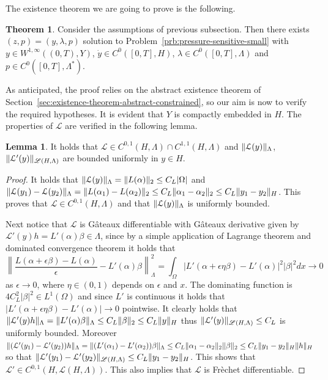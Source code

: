 \documentclass[a4paper,10pt,oneside]{amsbook}
\numberwithin{section}{chapter}
\numberwithin{equation}{chapter}
\theoremstyle{definition}
\newtheorem{thm}[prop]{Theorem}
\newtheorem{lemma}[prop]{Lemma}
\DeclarePairedDelimiter{\norm}{\lVert}{\rVert}
\begin{document}
The existence theorem we are going to prove is the following.
\begin{thm}
\label{thm:existence-pressure-small}
Consider the assumptions of previous subsection. Then there exists $(z,p)=(y,\lambda,p)$ solution to Problem~\ref{prb:pressure-sensitive-small} with $y\in W^{1,\infty}((0,T),Y)$, $\dot y\in C^0([0,T],H)$, $\lambda\in C^0([0,T],\Lambda)$ and $p\in C^0([0,T],\Lambda^*)$.
\end{thm}
As anticipated, the proof relies on the abstract existence theorem of Section~\ref{sec:existence-theorem-abstract-constrained}, so our aim is now to verify the required hypotheses. It is evident that $Y$ is compactly embedded in $H$. The properties of $\mathcal{L}$ are verified in the following lemma.
\begin{lemma}
It holds that $\mathcal{L}\in C^{0,1}(H,\Lambda)\cap C^{1,1}(H,\Lambda)$ and $\norm{\mathcal{L}(y)}_\Lambda$, $\norm{\mathcal{L}'(y)}_{\mathscr{L}(H,\Lambda)}$ are bounded uniformly in $y\in H$.
\end{lemma}
\begin{proof}
It holds that $\norm{\mathcal{L}(y)}_\Lambda=\norm{L(\alpha)}_2\le C_L|\Omega|$ and $\norm{\mathcal{L}(y_1)-\mathcal{L}(y_2)}_\Lambda=\norm{L(\alpha_1)-L(\alpha_2)}_2\le C_L\norm{\alpha_1-\alpha_2}_2\le C_L\norm{y_1-y_2}_H$. This proves that $\mathcal{L}\in C^{0,1}(H,\Lambda)$ and that $\norm{\mathcal{L}(y)}_\Lambda$ is uniformly bounded.

Next notice that $\mathcal{L}$ is G\^ateaux differentiable with G\^ateaux derivative given by $\mathcal{L}'(y)h=L'(\alpha)\beta\in\Lambda$, since by a simple application of Lagrange theorem and dominated convergence theorem it holds that
\[
\left\|\frac{{L}(\alpha+\epsilon\beta)-{L}(\alpha)}{\epsilon}-L'(\alpha)\beta\right\|_\Lambda^2=\int_\Omega|L'(\alpha+\epsilon\eta\beta)-L'(\alpha)|^2|\beta|^2dx\to0
\]
as $\epsilon\to0$, where $\eta\in(0,1)$ depends on $\epsilon$ and $x$. The dominating function is $4C_L^2|\beta|^2\in L^1(\Omega)$ and since $L'$ is continuous it holds that $|L'(\alpha+\epsilon\eta\beta)-L'(\alpha)|\to0$ pointwise. It clearly holds that $\norm{\mathcal{L}'(y)h}_\Lambda=\norm{L'(\alpha)\beta}_\Lambda\le C_L\norm{\beta}_2\le C_L\norm{y}_H$ thus $\norm{\mathcal{L}'(y)}_{\mathscr{L}(H,\Lambda)}\le C_L$ is uniformly bounded. Moreover $\norm{(\mathcal{L}'(y_1)-\mathcal{L}'(y_2))h}_\Lambda=\norm{({L}'(\alpha_1)-{L}'(\alpha_2))\beta}_\Lambda\le C_L\norm{\alpha_1-\alpha_2}_2\norm{\beta}_2\le C_L\norm{y_1-y_2}_H\norm{h}_H$ so that $\norm{\mathcal{L}'(y_1)-\mathcal{L}'(y_2)}_{\mathscr{L}(H,\Lambda)}\le C_L\norm{y_1-y_2}_H$. This shows that $\mathcal{L}'\in C^{0,1}(H,\mathscr{L}(H,\Lambda))$. This also implies that $\mathcal{L}$ is Frèchet differentiable.
\end{proof}
\end{document}
